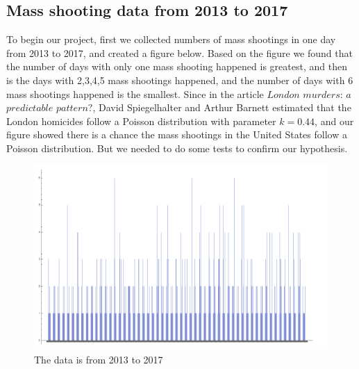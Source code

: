 \documentclass[12pt]{article}
\begin{document}
\subsection{Mass shooting data from 2013 to 2017}
\par To begin our project, first we collected numbers of mass shootings in one day from 2013 to 2017, and created a figure below. Based on the figure we found that the number of days with only one mass shooting happened is greatest, and then is the days with 2,3,4,5 mass shootings happened, and the number of days with 6 mass shootings happened is the smallest. Since in the article $London$ $murders$: $a$ $predictable$ $pattern?$, David Spiegelhalter and Arthur Barnett estimated that the London homicides follow a Poisson distribution with parameter $k=0.44$, and our figure showed there is a chance the mass shootings in the United States follow a Poisson distribution. But we needed to do some tests to confirm our hypothesis.
\begin{figure}[H]
\centering
\includegraphics[scale=0.35]{Q2.jpg}
\caption{The data is from 2013 to 2017}
\end{figure}
\end{document}
